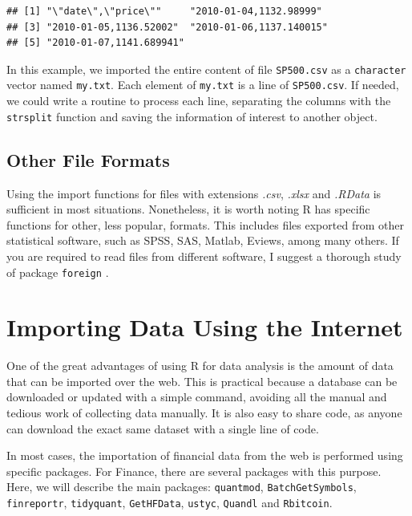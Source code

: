 \documentclass[11pt,]{book}
\begin{document}
\begin{verbatim}
## [1] "\"date\",\"price\""     "2010-01-04,1132.98999" 
## [3] "2010-01-05,1136.52002"  "2010-01-06,1137.140015"
## [5] "2010-01-07,1141.689941"
\end{verbatim}

In this example, we imported the entire content of file
\texttt{SP500.csv} as a \texttt{character} vector named \texttt{my.txt}.
Each element of \texttt{my.txt} is a line of \texttt{SP500.csv}. If
needed, we could write a routine to process each line, separating the
columns with the \texttt{strsplit} function and saving the information
of interest to another object. 

\subsection{Other File Formats}\label{other-file-formats}

Using the import functions for files with extensions \emph{.csv},
\emph{.xlsx} and \emph{.RData} is sufficient in most situations.
Nonetheless, it is worth noting R has specific functions for other, less
popular, formats. This includes files exported from other statistical
software, such as SPSS, SAS, Matlab, Eviews, among many others. If you
are required to read files from different software, I suggest a thorough
study of package \texttt{foreign} \citep{RCoreTeam2015foreign}.

\section{Importing Data Using the
Internet}\label{importing-data-using-the-internet}

One of the great advantages of using R for data analysis is the amount
of data that can be imported over the web. This is practical because a
database can be downloaded or updated with a simple command, avoiding
all the manual and tedious work of collecting data manually. It is also
easy to share code, as anyone can download the exact same dataset with a
single line of code.

In most cases, the importation of financial data from the web is
performed using specific packages. For Finance, there are several
packages with this purpose. Here, we will describe the main packages:
\texttt{quantmod}, \texttt{BatchGetSymbols}, \texttt{finreportr},
\texttt{tidyquant}, \texttt{GetHFData}, \texttt{ustyc}, \texttt{Quandl}
and \texttt{Rbitcoin}.
\end{document}
